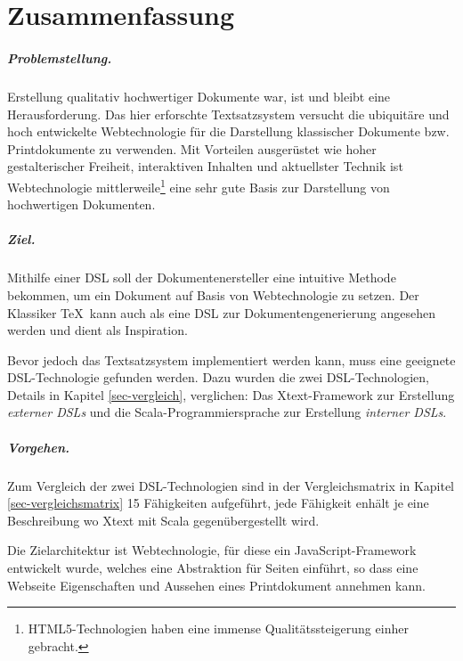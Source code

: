 \chapter{Zusammenfassung}


\paragraph{Problemstellung.}

Erstellung qualitativ hochwertiger Dokumente war,
ist und bleibt eine Herausforderung.
Das hier erforschte Textsatzsystem versucht die ubiquitäre und hoch entwickelte
Webtechnologie für die Darstellung klassischer Dokumente bzw. Printdokumente
zu verwenden.
Mit Vorteilen ausgerüstet wie hoher gestalterischer Freiheit,
interaktiven Inhalten und aktuellster Technik ist Webtechnologie
mittlerweile\footnote{
HTML5-Technologien haben eine immense Qualitätssteigerung einher gebracht.}
eine sehr gute Basis zur Darstellung von hochwertigen Dokumenten.


\paragraph{Ziel.}

Mithilfe einer DSL soll der Dokumentenersteller eine intuitive Methode
bekommen, um ein Dokument auf Basis von Webtechnologie zu setzen.
Der Klassiker \TeX~kann auch als eine DSL zur Dokumentengenerierung
angesehen werden und dient als Inspiration.

Bevor jedoch das Textsatzsystem implementiert werden kann, muss eine
geeignete DSL-Technologie gefunden werden.
Dazu wurden die zwei DSL-Technologien, Details in Kapitel \ref{sec-vergleich},
verglichen:
Das Xtext-Framework zur Erstellung \emph{externer DSLs} und
die Scala-Programmiersprache zur Erstellung \emph{interner DSLs}.


\paragraph{Vorgehen.}

Zum Vergleich der zwei DSL-Technologien sind
in der Vergleichsmatrix in Kapitel \ref{sec-vergleichsmatrix}
15 Fähigkeiten aufgeführt, jede Fähigkeit enhält je eine Beschreibung
wo Xtext mit Scala gegenübergestellt wird.

Die Zielarchitektur ist Webtechnologie, für diese ein JavaScript-Framework
entwickelt wurde, welches eine Abstraktion für Seiten einführt, so dass eine
Webseite Eigenschaften und Aussehen eines Printdokument annehmen kann.

